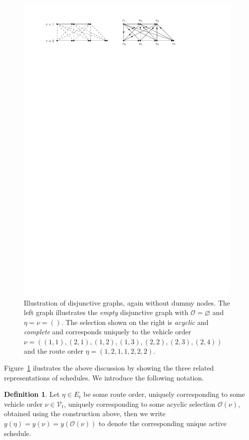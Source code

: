 \documentclass[a4paper]{report}
\theoremstyle{definition}
\newtheorem{define}{Definition}[chapter]
\theoremstyle{plain}
\begin{document}
\begin{figure}
  \centering
  \includegraphics[width=0.98\textwidth]{figures/single/disjunctive_graph.pdf}
  \caption{Illustration of disjunctive graphs, again without dummy nodes. The
    left graph illustrates the \textit{empty} disjunctive graph with $\mathcal{O} = \varnothing$
    and $\eta = \nu = ()$. The selection shown on the right is \emph{acyclic} and \emph{complete}
    and corresponds uniquely to the vehicle order
    $\nu = ((1,1), (2,1), (1,2), (1,3), (2,2), (2,3), (2,4))$ and the route order
    $\eta = (1, 2, 1, 1, 2, 2, 2)$.}\label{fig:disjunctive-graphs}
\end{figure}

Figure~\ref{fig:disjunctive-graphs} ilustrates the above discussion by showing the three related
representations of schedules.
%
We introduce the following notation.

\begin{define}\label{def:orders}
  Let $\eta \in E_t$ be some route order, uniquely corresponding to some vehicle
  order $\nu \in \mathcal{V}_t$, uniquely corresponding to some acyclic
  selection $\mathcal{O}(\nu)$, obtained using the construction above, then we
  write $y(\eta) = y(\nu) = y(\mathcal{O}(\nu))$ to denote the corresponding unique
  active schedule.
\end{define}
\end{document}
